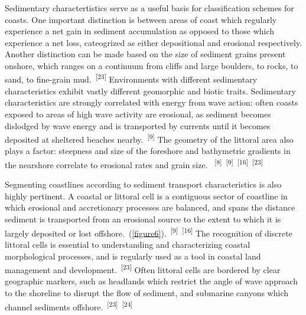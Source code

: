 \documentclass{article}
\begin{document}
\par{Sedimentary charactertistics serve as a useful basis for classification schemes for coasts. One important distinction is between areas of coast which regularly experience a net gain in sediment accumulation as opposed to those which experience a net loss, cateogrized as either depositional and erosional respectively. Another distinction can be made based on the size of sediment grains present onshore, which ranges on a continuum from cliffs and large boulders, to rocks, to sand, to fine-grain mud.~\textsuperscript{[23]} Environments with different sedimentary characteristics exhibit vastly different geomorphic and biotic traits. Sedimentary characteristics are strongly correlated with energy from wave action: often coasts exposed to areas of high wave activity are erosional, as sediment becomes dislodged by wave energy and is transported by currents until it becomes deposited at sheltered beaches nearby.~\textsuperscript{[9]} The geometry of the littoral area also plays a factor: steepness and size of the foreshore and bathymetric gradients in the nearshore correlate to erosional rates and grain size. ~\textsuperscript{[8]}~\textsuperscript{[9]}~\textsuperscript{[16]}~\textsuperscript{[23]}}

\par{Segmenting coastlines according to sediment transport characteristics is also highly pertinent. A coastal or littoral cell is a contiguous sector of coastline in which erosional and accretionary processes are balanced, and spans the distance sediment is transported from an erosional source to the extent to which it is largely deposited or lost offshore.~(\cref{figure6}).~\textsuperscript{[9]}~\textsuperscript{[16]} The recognition of discrete littoral cells is essential to understanding and characterizing coastal morphological processes, and is regularly used as a tool in coastal land management and development.~\textsuperscript{[23]} Often littoral cells are bordered by clear geographic markers, such as headlands which restrict the angle of wave approach to the shoreline to disrupt the flow of sediment, and submarine canyons which channel sediments offshore.~\textsuperscript{[23]}~\textsuperscript{[24]} \par}
\end{document}
